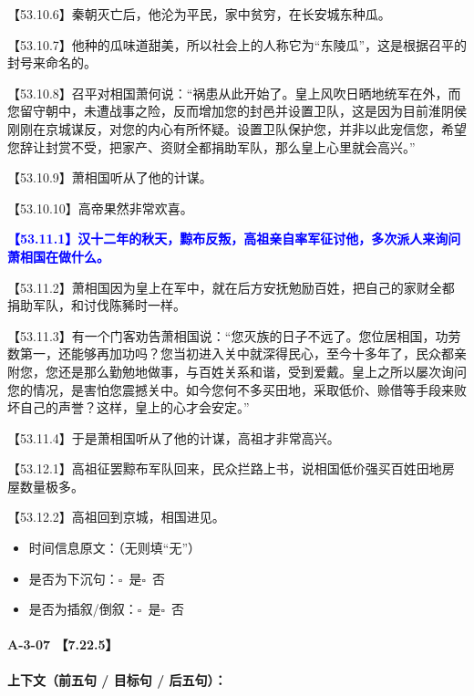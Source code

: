 \documentclass[fontset=none,11pt,a4paper]{ctexart}
\newcommand{\answerline}[1]{\underline{\hspace{#1}}}
\newcommand{\choicebox}[1]{$\square$~#1}
\begin{document}
\noindent 【53.10.6】秦朝灭亡后，他沦为平民，家中贫穷，在长安城东种瓜。\par
\noindent 【53.10.7】他种的瓜味道甜美，所以社会上的人称它为“东陵瓜”，这是根据召平的封号来命名的。\par
\noindent 【53.10.8】召平对相国萧何说：“祸患从此开始了。皇上风吹日晒地统军在外，而您留守朝中，未遭战事之险，反而增加您的封邑并设置卫队，这是因为目前淮阴侯刚刚在京城谋反，对您的内心有所怀疑。设置卫队保护您，并非以此宠信您，希望您辞让封赏不受，把家产、资财全都捐助军队，那么皇上心里就会高兴。”\par
\noindent 【53.10.9】萧相国听从了他的计谋。\par
\noindent 【53.10.10】高帝果然非常欢喜。\par
\noindent \textcolor{blue}{\textbf{【53.11.1】汉十二年的秋天，黥布反叛，高祖亲自率军征讨他，多次派人来询问萧相国在做什么。}}\par
\noindent 【53.11.2】萧相国因为皇上在军中，就在后方安抚勉励百姓，把自己的家财全都捐助军队，和讨伐陈豨时一样。\par
\noindent 【53.11.3】有一个门客劝告萧相国说：“您灭族的日子不远了。您位居相国，功劳数第一，还能够再加功吗？您当初进入关中就深得民心，至今十多年了，民众都亲附您，您还是那么勤勉地做事，与百姓关系和谐，受到爱戴。皇上之所以屡次询问您的情况，是害怕您震撼关中。如今您何不多买田地，采取低价、赊借等手段来败坏自己的声誉？这样，皇上的心才会安定。”\par
\noindent 【53.11.4】于是萧相国听从了他的计谋，高祖才非常高兴。\par
\noindent 【53.12.1】高祖征罢黥布军队回来，民众拦路上书，说相国低价强买百姓田地房屋数量极多。\par
\noindent 【53.12.2】高祖回到京城，相国进见。\par

\begin{itemize}
  \item 时间信息原文：\answerline{7.5cm}（无则填“无”）
  \item 是否为下沉句：\choicebox{是}\quad \choicebox{否}
  \item 是否为插叙/倒叙：\choicebox{是}\quad \choicebox{否}
\end{itemize}

\paragraph{A-3-07 \quad 【7.22.5】}
\textbf{上下文（前五句 / 目标句 / 后五句）：}
\end{document}
